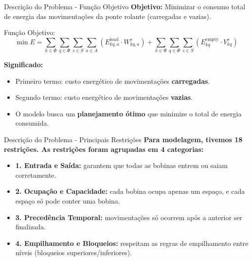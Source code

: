 \begin{frame}{Descrição do Problema - Função Objetivo}
\textbf{Objetivo:} Minimizar o consumo total de energia das movimentações da ponte rolante (carregadas e vazias).

\vspace{0.3cm}

\begin{block}{Função Objetivo:}
    \[
    \min E = 
    \sum_{k \in \Phi} \sum_{q \in \Phi} \sum_{s \in S} \sum_{a \in A} 
    \left( E^{\text{load}}_{kq,a} \cdot W^s_{kq,a} \right) +
    \sum_{k \in \Phi} \sum_{q \in \Phi} \sum_{s \in S}
    \left( E^{\text{empty}}_{kq} \cdot V^s_{kq} \right)
    \]
\end{block}

\vspace{0.4cm}
\textbf{Significado:}
\begin{itemize}
    \item Primeiro termo: custo energético de movimentações \textbf{carregadas}.
    \item Segundo termo: custo energético de movimentações \textbf{vazias}.
    \item O modelo busca um \textbf{planejamento ótimo} que minimize o total de energia consumida.
\end{itemize}
\end{frame}


\begin{frame}{Descrição do Problema - Principais Restrições}
\textbf{Para modelagem, tivemos 18 restrições. As restrições foram agrupadas em 4 categorias:}
\begin{itemize}
    \item \textbf{1. Entrada e Saída:} garantem que todas as bobinas entrem ou saiam corretamente.
    \item \textbf{2. Ocupação e Capacidade:} cada bobina ocupa apenas um espaço, e cada espaço só pode conter uma bobina.
    \item \textbf{3. Precedência Temporal:} movimentações só ocorrem após a anterior ser finalizada.
    \item \textbf{4. Empilhamento e Bloqueios:} respeitam as regras de empilhamento entre níveis (bloqueios superiores/inferiores).
\end{itemize}

\end{frame}

